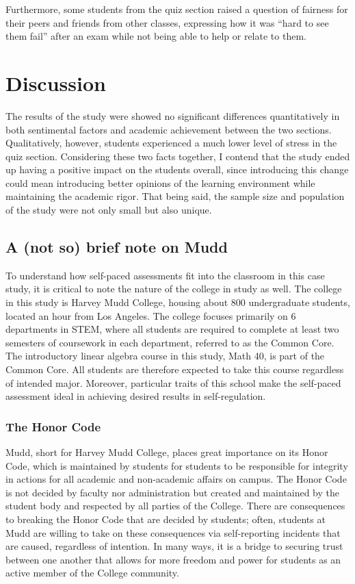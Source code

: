 Furthermore, some students from the quiz section raised a question of fairness for their peers and friends from other classes, expressing how it was ``hard to see them fail'' after an exam while not being able to help or relate to them.

\section{Discussion}

The results of the study were showed no significant differences quantitatively in both sentimental factors and academic achievement between the two sections. Qualitatively, however, students experienced a much lower level of stress in the quiz section. Considering these two facts together, I contend that the study ended up having a positive impact on the students overall, since introducing this change could mean introducing better opinions of the learning environment while maintaining the academic rigor. That being said, the sample size and population of the study were not only small but also unique.

\subsection{A (not so) brief note on Mudd}
To understand how self-paced assessments fit into the classroom in this case study, it is critical to note the nature of the college in study as well. The college in this study is Harvey Mudd College, housing about 800 undergraduate students, located an hour from Los Angeles. The college focuses primarily on 6 departments in STEM, where all students are required to complete at least two semesters of coursework in each department, referred to as the Common Core. The introductory linear algebra course in this study, Math 40, is part of the Common Core. All students are therefore expected to take this course regardless of intended major. Moreover, particular traits of this school make the self-paced assessment ideal in achieving desired results in self-regulation.

\subsubsection{The Honor Code}
Mudd, short for Harvey Mudd College, places great importance on its Honor Code, which is maintained by students for students to be responsible for integrity in actions for all academic and non-academic affairs on campus. The Honor Code is not decided by faculty nor administration but created and maintained by the student body and respected by all parties of the College. There are consequences to breaking the Honor Code that are decided by students; often, students at Mudd are willing to take on these consequences via self-reporting incidents that are caused, regardless of intention. In many ways, it is a bridge to securing trust between one another that allows for more freedom and power for students as an active member of the College community.

